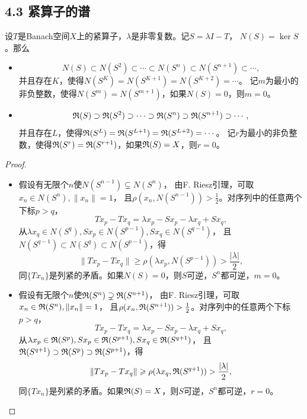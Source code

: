 \subsection{4.3 紧算子的谱}
\begin{2}
    设$T$是Banach空间$X$上的紧算子，$\lambda$是非零复数。记$S=\lambda I-T$，
    $N(S)=\ker S$。那么
    \begin{itemize}
    \item[(i)] \[N(S)\subset N(S^2)\subset\cdots\subset N(S^n)
    \subset N(S^{n+1})\subset\cdots,\]
    并且存在$K$，使得$N(S^K)=N(S^{K+1})=N(S^{K+2})=\cdots$。
    记$m$为最小的非负整数，使得$N(S^m)=N(S^{m+1})$，如果$N(S)=0$，则$m=0$。
    \item[(ii)] \[\mathfrak{R}(S)\supset \mathfrak{R}(S^2)\supset\cdots\supset \mathfrak{R}(S^n)
    \supset \mathfrak{R}(S^{n+1})\supset\cdots,\]
    并且存在$L$，使得$\mathfrak{R}(S^L)=\mathfrak{R}(S^{L+1})=\mathfrak{R}(S^{L+2})=\cdots$。
    记$r$为最小的非负整数，使得$\mathfrak{R}(S^r)=\mathfrak{R}(S^{r+1})$，如果$\mathfrak{R}(S)=X$，则$r=0$。
    \end{itemize}
\end{2}
\begin{proof}
\begin{itemize}
    \item[(i)] 假设有无限个$n$使$N(S^{n-1})\subsetneq N(S^n)$，
    由F. Riesz引理，可取$x_n\in N(S^n),\|x_n\|=1$，
    且$\rho(x_n,N(S^{n-1}))>\frac{1}{2}$。对序列中的任意两个下标$p>q$，
    \[Tx_p-Tx_q=\lambda x_p-Sx_p-\lambda x_q+Sx_q,\]
    从$\lambda x_q\in N(S^q),Sx_p\in N(S^{p-1}),Sx_q\in N(S^{q-1})$，
    且$N(S^{q-1}) \subset N(S^q) \subset N(S^{p-1})$，得
    \[\|Tx_p-Tx_q\|\geqslant\rho(\lambda x_p,N(S^{p-1}))
    >\frac{|\lambda|}{2},\]
    同$\{Tx_n\}$是列紧的矛盾。如果$N(S)=0$，则$S$可逆，$S^n$都可逆，$m=0$。
    \item[(ii)] 假设有无限个$n$使$\mathfrak{R}(S^n)\supsetneq \mathfrak{R}(S^{n+1})$，
    由F. Riesz引理，可取$x_n\in\mathfrak{R}(S^n),\|x_n\|=1$，
    且$\rho(x_n,\mathfrak{R}(S^{n+1}))>\frac{1}{2}$。对序列中的任意两个下标$p>q$，
    \[Tx_p-Tx_q=\lambda x_p-Sx_p-\lambda x_q+Sx_q,\]
    从$\lambda x_p\in\mathfrak{R}(S^p),Sx_p\in\mathfrak{R}(S^{p+1}),Sx_q\in\mathfrak{R}(S^{q+1})$，
    且$\mathfrak{R}(S^{q+1}) \supset \mathfrak{R}(S^p) \supset \mathfrak{R}(S^{p+1})$，得
    \[\|Tx_p-Tx_q\|\geqslant\rho(\lambda x_q,\mathfrak{R}(S^{q+1}))
    >\frac{|\lambda|}{2},\]
    同$\{Tx_n\}$是列紧的矛盾。如果$\mathfrak{R}(S)=X$，则$S$可逆，$S^n$都可逆，$r=0$。\qedhere
\end{itemize}
\end{proof}
